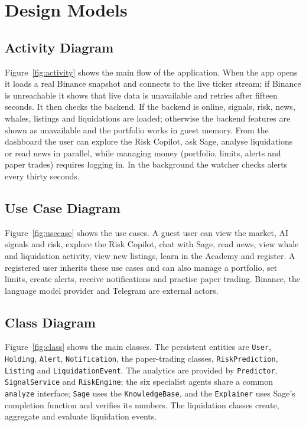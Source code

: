 \section{Design Models}
\subsection{Activity Diagram}
Figure~\ref{fig:activity} shows the main flow of the application. When the app opens it loads a real Binance snapshot and connects to the live ticker stream; if Binance is unreachable it shows that live data is unavailable and retries after fifteen seconds. It then checks the backend. If the backend is online, signals, risk, news, whales, listings and liquidations are loaded; otherwise the backend features are shown as unavailable and the portfolio works in guest memory. From the dashboard the user can explore the Risk Copilot, ask Sage, analyse liquidations or read news in parallel, while managing money (portfolio, limits, alerts and paper trades) requires logging in. In the background the watcher checks alerts every thirty seconds.


\subsection{Use Case Diagram}
Figure~\ref{fig:usecase} shows the use cases. A guest user can view the market, AI signals and risk, explore the Risk Copilot, chat with Sage, read news, view whale and liquidation activity, view new listings, learn in the Academy and register. A registered user inherits these use cases and can also manage a portfolio, set limits, create alerts, receive notifications and practise paper trading. Binance, the language model provider and Telegram are external actors.


\subsection{Class Diagram}
Figure~\ref{fig:class} shows the main classes. The persistent entities are \texttt{User}, \texttt{Holding}, \texttt{Alert}, \texttt{Notification}, the paper-trading classes, \texttt{RiskPrediction}, \texttt{Listing} and \texttt{LiquidationEvent}. The analytics are provided by \texttt{Predictor}, \texttt{SignalService} and \texttt{RiskEngine}; the six specialist agents share a common \texttt{analyze} interface; \texttt{Sage} uses the \texttt{KnowledgeBase}, and the \texttt{Explainer} uses Sage's completion function and verifies its numbers. The liquidation classes create, aggregate and evaluate liquidation events.

